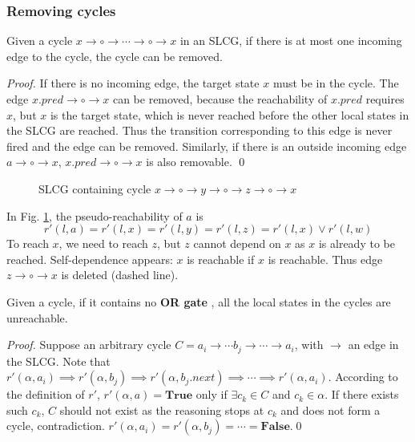 \documentclass[runningheads]{llncs}
\begin{document}
\subsubsection{Removing cycles}
\begin{theorem}\label{th:break_cycle}
Given a cycle $x\to \circ \to \cdots \to \circ \to x$ in an SLCG, if there is at most one incoming edge to the cycle, the cycle can be removed.
\end{theorem}
\begin{proof}
If there is no incoming edge, the target state $x$ must be in the cycle. 
The edge $x.pred\to\circ\to x$ can be removed, because the reachability of $x.pred$ requires $x$, but $x$ is the target state, which is never reached before the other local states in the SLCG are reached.
Thus the transition corresponding to this edge is never fired and the edge can be removed.
Similarly, if there is an outside incoming edge $a\to \circ \to x$, $x.pred\to\circ\to x$ is also removable.
\qed
\end{proof}


\begin{example}
    \begin{figure}[H]
        \centering
        
        \caption{SLCG containing cycle $x\to \circ \to y \to \circ \to z\to \circ \to x$}
        \label{cycle1}
    \end{figure}
    
    In Fig. \ref{cycle1}, the pseudo-reachability of $a$ is 
    $$r'(l,a)=r'(l,x)=r'(l,y)=r'(l,z)=r'(l,x)\lor r'(l,w)$$
    To reach $x$, we need to reach $z$, but $z$ cannot depend on $x$ as $x$ is already to be reached. 
    Self-dependence appears: $x$ is reachable if $x$ is reachable.
    Thus edge $z\to \circ \to x$ is deleted (dashed line).
\end{example}

\begin{theorem}\label{th:break_cycle2}
Given a cycle, if it contains no \textbf{OR gate}%
, all the local states in the cycles are unreachable.
\end{theorem}

\begin{proof}
Suppose an arbitrary cycle $C=a_i\to \cdots b_j\to\cdots \to a_i$, with $\to$ an edge in the SLCG.
Note that $r'(\alpha,a_i)\implies r'(\alpha,b_j)\implies r'(\alpha,b_j.next)\implies \cdots\implies r'(\alpha,a_i)$.
According to the definition of $r'$, $r'(\alpha,a)=\mathbf{True}$ only if $\exists c_k\in C$ and $c_k\in \alpha$.
If there exists such $c_k$, $C$ should not exist as the reasoning stops at $c_k$ and does not form a cycle, contradiction.
$r'(\alpha,a_i)=r'(\alpha,b_j)=\cdots =\mathbf{False}$.\qed
\end{proof}
\end{document}
